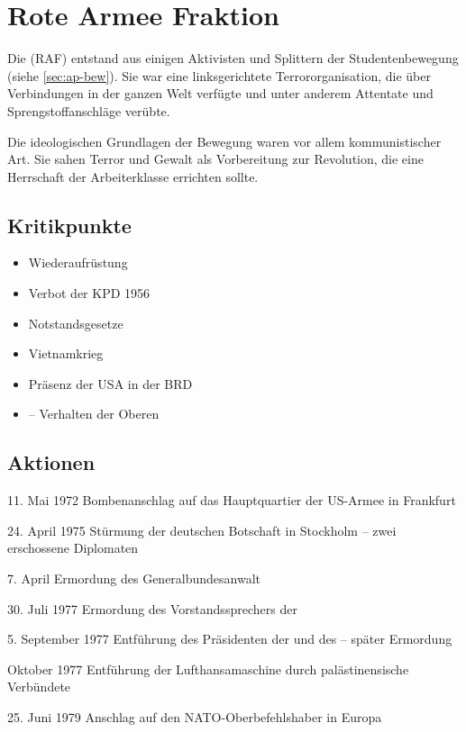 \section[Rote Armee Fraktion]{Rote Armee Fraktion}
\label{sec:raf}

Die  (RAF) entstand
 aus einigen Aktivisten und Splittern der Studentenbewegung
(siehe \ref{sec:ap-bew}). Sie war eine linksgerichtete
Terrororganisation, die über Verbindungen in der ganzen Welt verfügte
und unter anderem Attentate und Sprengstoffanschläge verübte.

Die ideologischen Grundlagen der Bewegung waren vor allem
kommunistischer Art. Sie sahen Terror und Gewalt als Vorbereitung zur
Revolution, die eine Herrschaft der Arbeiterklasse errichten
sollte.

\subsection*{Kritikpunkte}

\begin{itemize}
\item Wiederaufrüstung
\item Verbot der KPD 1956
\item Notstandsgesetze
\item Vietnamkrieg
\item Präsenz der USA in der BRD
\item {} -- Verhalten der
Oberen
\end{itemize}


\subsection*{Aktionen}

\begin{chronik}
\item[11. Mai 1972] Bombenanschlag auf das Hauptquartier der US-Armee
in Frankfurt
\item[24. April 1975] Stürmung der deutschen Botschaft in Stockholm --
zwei erschossene Diplomaten
\item[7. April] Ermordung des Generalbundesanwalt 
\item[30. Juli 1977] Ermordung des Vorstandssprechers der
 
\item[5. September 1977] Entführung des Präsidenten der
 und des
  -- später Ermordung
\item[Oktober 1977] Entführung der Lufthansamaschine  durch palästinensische Verbündete
\item[25. Juni 1979] Anschlag auf den NATO-Oberbefehlshaber in Europa
\end{chronik}


